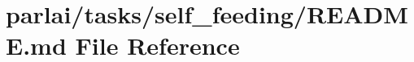 \hypertarget{parlai_2tasks_2self__feeding_2README_8md}{}\section{parlai/tasks/self\+\_\+feeding/\+R\+E\+A\+D\+ME.md File Reference}
\label{parlai_2tasks_2self__feeding_2README_8md}
